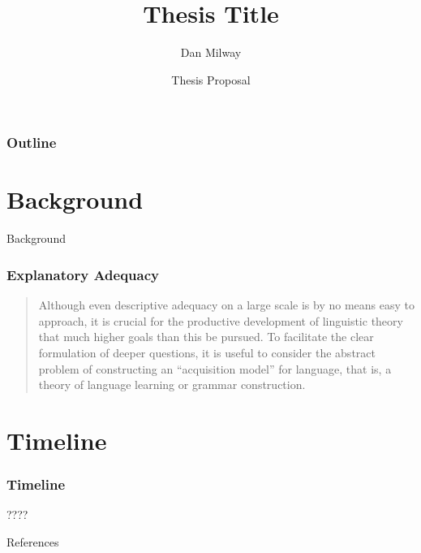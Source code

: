 \documentclass{beamer}
\title{Thesis Title}
\date[Proposal]{Thesis Proposal}
\author[Milway]{Dan Milway}
\begin{document}
\begin{frame}
	\titlepage
\end{frame}
\begin{frame}
	\frametitle{Outline}
	\tableofcontents
\end{frame}
\section{Background}
\begin{frame}{Background}
	\frametitle{Explanatory Adequacy}
	\begin{quote}
		Although even descriptive adequacy on a large scale is by no means easy to approach, it is crucial for the productive development of linguistic theory that much higher goals than this be pursued. 
		To facilitate the clear formulation of deeper questions, it is useful to consider the abstract problem of constructing an “acquisition model” for language, that is, a theory of language learning or grammar construction.
		\parencite[pp.24-25]{chomsky1965aspects}
	\end{quote}
\end{frame}
\section{Timeline}
\begin{frame}
	\frametitle{Timeline}
	????
\end{frame}
\begin{frame}{References}
	\printbibliography
\end{frame}
\end{document}
